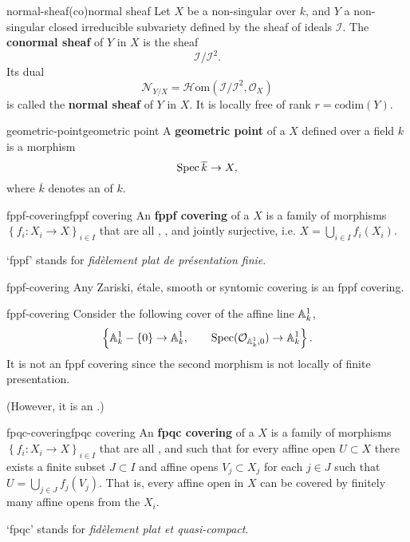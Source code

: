 \begin{topic}{normal-sheaf}{(co)normal sheaf}
    Let $X$ be a non-singular  over $k$, and $Y$ a non-singular closed irreducible subvariety defined by the sheaf of ideals $\mathcal{I}$. The \textbf{conormal sheaf} of $Y$ in $X$ is the sheaf
    \[ \mathcal{I}/\mathcal{I}^2 . \]
    Its dual
    \[ \mathcal{N}_{Y/X} = \mathcal{H}\text{om}(\mathcal{I}/\mathcal{I}^2, \mathcal{O}_X) \]
    is called the \textbf{normal sheaf} of $Y$ in $X$. It is locally free of rank $r = \text{codim}(Y)$.
\end{topic}

\begin{topic}{geometric-point}{geometric point}
    A \textbf{geometric point} of a  $X$ defined over a field $k$ is a morphism
    \[ \Spec \overline{k} \to X , \]
    where $\overline{k}$ denotes an  of $k$.
\end{topic}

\begin{topic}{fppf-covering}{fppf covering}
    An \textbf{fppf covering} of a  $X$ is a family of morphisms $\left\{ f_i : X_i \to X \right\}_{i \in I}$ that are all , , and jointly surjective, i.e. $X = \bigcup_{i \in I} f_i(X_i)$.
    
    `fppf' stands for \textit{fidèlement plat de présentation finie}.
\end{topic}

\begin{example}{fppf-covering}
    Any Zariski, étale, smooth or syntomic covering is an fppf covering.
\end{example}

\begin{example}{fppf-covering}
    Consider the following cover of the affine line $\AA^1_k$,
    \[ \left\{ \AA^1_k - \{ 0 \} \to \AA^1_k, \qquad \Spec(\mathcal{O}_{\AA^1_k, 0}) \to \AA^1_k \right\} . \]
    It is not an fppf covering since the second morphism is not locally of finite presentation.
    
    (However, it is an .)
\end{example}

\begin{topic}{fpqc-covering}{fpqc covering}
    An \textbf{fpqc covering} of a  $X$ is a family of morphisms $\left\{ f_i : X_i \to X \right\}_{i \in I}$ that are all , and such that for every affine open $U \subset X$ there exists a finite subset $J \subset I$ and affine opens $V_j \subset X_j$ for each $j \in J$ such that $U = \bigcup_{j \in J} f_j(V_j)$. That is, every affine open in $X$ can be covered by finitely many affine opens from the $X_i$.
    
    `fpqc' stands for \textit{fidèlement plat et quasi-compact}.
\end{topic}

